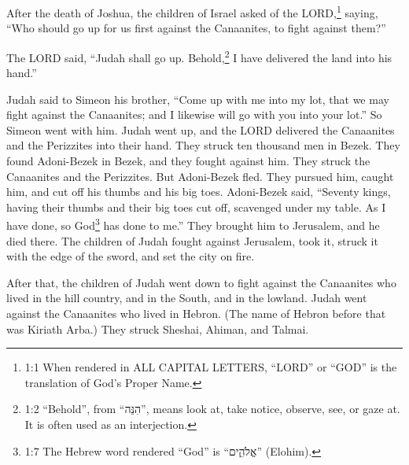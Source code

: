 




\vspace{-1.36in}
\mychapter{} \myverse*{}After the death of Joshua, the children of Israel asked of the
LORD,\footnote{1:1 When rendered in ALL CAPITAL LETTERS, “LORD” or “GOD” is the translation of God’s Proper Name.}
saying, “Who should go up for us first against the Canaanites, to fight against them?”

\myverse{}The LORD said, “Judah shall go up. Behold,\footnote{1:2 “Behold”, from “הִנֵּה”, means look at, take notice, observe, see, or gaze at. It is
	often used as an interjection.} I have delivered the land into his hand.”

\myverse{}Judah said to Simeon his brother, “Come up with me into my lot,
that we may fight against the Canaanites; and I likewise will go with you into your lot.” So Simeon went
with him.
\myverse{}Judah went up, and the LORD delivered the Canaanites and the Perizzites into
their hand. They struck ten thousand men in Bezek.
\myverse{}They found Adoni-Bezek in Bezek, and they fought against him. They struck the
Canaanites and the Perizzites.
\myverse{}But Adoni-Bezek fled. They pursued him, caught him, and cut off his thumbs and
his big toes.
\myverse{}Adoni-Bezek said, “Seventy kings, having their thumbs and their big toes cut
off, scavenged under my table. As I have done, so God\footnote{1:7 The Hebrew word rendered “God” is “אֱלֹהִ֑ים” (Elohim).} has done to me.” They
brought him to Jerusalem, and he died there.
\myverse{}The children of Judah fought against Jerusalem, took it, struck it with the
edge of the sword, and set the city on fire.

\myverse{}After that, the children of Judah went down to fight against the
Canaanites who lived in the hill country, and in the South, and in the lowland.
\myverse{}Judah went against the Canaanites who lived in Hebron. (The name of Hebron
before that was Kiriath Arba.) They struck Sheshai, Ahiman, and Talmai.

